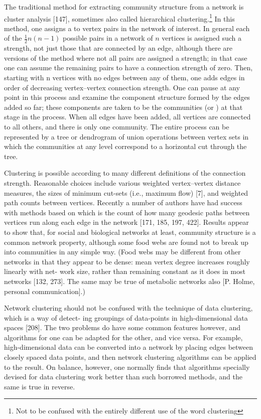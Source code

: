       The traditional method for extracting community structure from a network is cluster analysis [147], sometimes also called hierarchical clustering.\footnote{Not to be confused with the entirely different use of the word clustering} In this method, one assigns a  to vertex pairs in the network of interest. In general each of the $\frac{1}{2} n(n − 1)$ possible pairs in a network of $n$ vertices is assigned such a strength, not just those that are connected by an edge, although there are versions of the method where not all pairs are assigned a strength; in that case one can assume the remaining pairs to have a connection strength of zero. Then, starting with n vertices with no edges between any of them, one adds edges in order of decreasing vertex–vertex connection strength. One can pause at any point in this process and examine the component structure formed by the edges added so far; these components are taken to be the communities (or ) at that stage in the process. When all edges have been added, all vertices are connected to all others, and there is only one community. The entire process can be represented by a tree or dendrogram of union operations between vertex sets in which the communities at any level correspond to a horizontal cut through the tree.
      
      Clustering is possible according to many different definitions of the connection strength. Reasonable choices include various weighted vertex–vertex distance measures, the sizes of minimum cut-sets (i.e., maximum flow) [7], and weighted path counts between vertices. Recently a number of authors have had success with methods based on  which is the count of how many geodesic paths between vertices run along each edge in the network [171, 185, 197, 422]. Results appear to show that, for social and biological networks at least, community structure is a common network property, although some food webs are found not to break up into communities in any simple way. (Food webs may be different from other networks in that they appear to be dense: mean vertex degree increases roughly linearly with net- work size, rather than remaining constant as it does in most networks [132, 273]. The same may be true of metabolic networks also [P. Holme, personal communication].)
  
    
      Network clustering should not be confused with the technique of data clustering, which is a way of detect- ing groupings of data-points in high-dimensional data spaces [208]. The two problems do have some common features however, and algorithms for one can be adapted for the other, and vice versa. For example, high-dimensional data can be converted into a network by placing edges between closely spaced data points, and then network clustering algorithms can be applied to the result. On balance, however, one normally finds that algorithms specially devised for data clustering work better than such borrowed methods, and the same is true in reverse.
  
